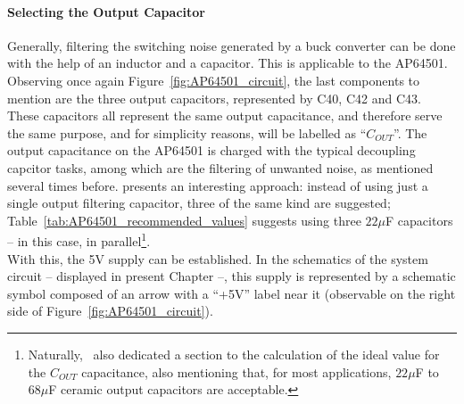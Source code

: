 \paragraph{Selecting the Output Capacitor}	Generally, filtering the switching noise generated by a buck converter can be done with the help of an inductor and a capacitor.
This is applicable to the AP64501.
Observing once again Figure~\ref{fig:AP64501_circuit}, the last components to mention are the three output capacitors, represented by C40, C42 and C43. These capacitors all represent the same output capacitance, and therefore serve the same purpose, and for simplicity reasons, will be labelled as ``$C_{OUT}$''. The output capacitance on the AP64501 is charged with the typical decoupling capcitor tasks, among which are the filtering of unwanted noise, as mentioned several times before.
\cite{AP64501} presents an interesting approach: instead of using just a single output filtering capacitor, three of the same kind are suggested; Table~\ref{tab:AP64501_recommended_values} suggests using three $22 \mu$F capacitors -- in this case, in parallel\footnote[12]{Naturally,~\cite{AP64501} also dedicated a section to the calculation of the ideal value for the $C_{OUT}$ capacitance, also mentioning that, for most applications, $22 \mu$F to $68 \mu$F ceramic output capacitors are acceptable.}.\\

With this, the 5V supply can be established. In the schematics of the system circuit -- displayed in present Chapter --, this supply is represented by a schematic symbol composed of an arrow with a ``+5V'' label near it (observable on the right side of Figure~\ref{fig:AP64501_circuit}).





